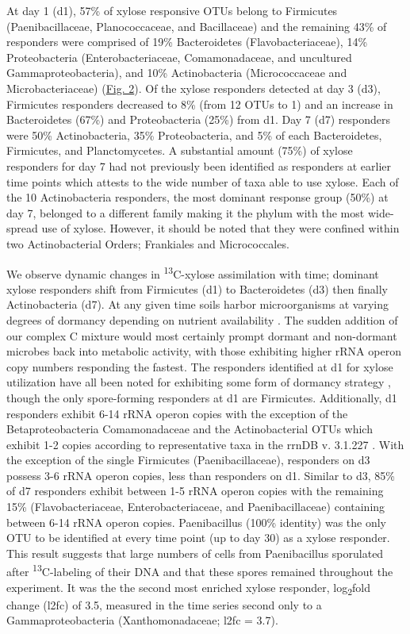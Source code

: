 At day 1 (d1), 57\% of xylose responsive OTUs belong to Firmicutes (Paenibacillaceae, Planococcaceae, and Bacillaceae) and the remaining 43\% of responders were comprised of 19\% Bacteroidetes (Flavobacteriaceae), 14\% Proteobacteria (Enterobacteriaceae, Comamonadaceae, and uncultured Gammaproteobacteria), and 10\% Actinobacteria (Micrococcaceae and Microbacteriaceae) (\href{https://www.authorea.com/users/3537/articles/3612/master/file/figures/l2fc_fig1/l2fc_fig.pdf}{Fig. 2}). Of the xylose responders detected at day 3 (d3), Firmicutes responders decreased to 8\% (from 12 OTUs to 1) and an increase in Bacteroidetes (67\%) and Proteobacteria (25\%) from d1. Day 7 (d7) responders were 50\% Actinobacteria, 35\% Proteobacteria, and 5\% of each Bacteroidetes, Firmicutes, and Planctomycetes. A substantial amount (75\%) of xylose responders for day 7 had not previously been identified as responders at earlier time points which attests to the wide number of taxa able to use xylose. Each of the 10 Actinobacteria responders, the most dominant response group (50\%) at day 7, belonged to a different family making it the phylum with the most wide-spread use of xylose. However, it should be noted that they were confined within two Actinobacterial Orders; Frankiales and Micrococcales. 

We observe dynamic changes in \textsuperscript{13}C-xylose assimilation with time; dominant xylose responders shift from Firmicutes (d1) to Bacteroidetes (d3) then finally Actinobacteria (d7). At any given time soils harbor microorganisms at varying degrees of dormancy depending on nutrient availability \cite{Jones_2010}. The sudden addition of our complex C mixture would most certainly prompt dormant and non-dormant microbes back into metabolic activity, with those exhibiting higher rRNA operon copy numbers responding the fastest. The responders identified at d1 for xylose utilization have all been noted for exhibiting some form of dormancy strategy \cite{Jones_2010, Mulyukin_2009, Darcy_2011, Sachidanandham_2008, Finkel_2006, Rittershaus_2013, Tada_2013, Lay_2013}, though the only spore-forming responders at d1 are Firmicutes. Additionally, d1 responders exhibit 6-14 rRNA operon copies with the exception of the Betaproteobacteria Comamonadaceae and the Actinobacterial OTUs which exhibit 1-2 copies according to representative taxa in the rrnDB v. 3.1.227 \cite{18948294,11125085}. With the exception of the single Firmicutes (Paenibacillaceae), responders on d3 possess 3-6 rRNA operon copies, less than responders on d1. Similar to d3, 85\% of d7 responders exhibit between 1-5 rRNA operon copies with the remaining 15\% (Flavobacteriaceae, Enterobacteriaceae, and Paenibacillaceae) containing between 6-14 rRNA operon copies. Paenibacillus (100\% identity) was the only OTU to be identified at every time point (up to day 30) as a xylose responder. This result suggests that large numbers of cells from Paenibacillus sporulated after \textsuperscript{13}C-labeling of their DNA and that these spores remained throughout the experiment. It was the the second most enriched xylose responder, log\textsubscript{2}fold change (l2fc) of 3.5, measured in the time series second only to a Gammaproteobacteria (Xanthomonadaceae; l2fc = 3.7).


